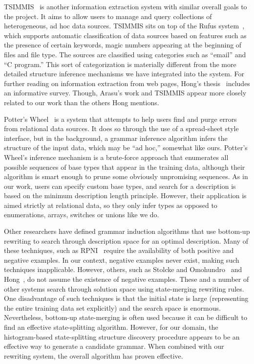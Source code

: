 TSIMMIS~\cite{chawathe+:tsimmis} is another information extraction
system with similar overall goals to the \pads{} project.  It aims to
allow users to manage and query collections of heterogeneous, ad hoc
data sources.  TSIMMIS sits on top of the Rufus
system~\cite{shoens+:rufus}, which supports automatic classification
of data sources based on features such as the presence of certain
keywords, magic numbers appearing at the beginning of files and file
type.  The sources are classified using categories such as ``email''
and ``C program.''  This sort of categorization is materially
different from the more detailed structure inference mechanisms we
have integrated into the \pads{} system.  For further reading on
information extraction from web pages, Hong's
thesis~\cite{hong:thesis} includes an informative survey.  Though,
Arasu's work and TSIMMIS appear more closely related to our work than
the others Hong mentions.

Potter's Wheel~\cite{raman+:potterwheel} is a system that attempts to
help users find and purge errors from
relational data sources.  It does so through the use of a spread-sheet
style interface, but in the background, a grammar inference algorithm
infers the structure of the input data, which may be ``ad hoc,'' 
somewhat like ours.  Potter's Wheel's inference mechanism is a brute-force
approach that enumerates all possible sequences of base types that appear
in the training data, although their algorithm is smart enough to
prune some obviously unpromising sequences.  As in our work,
users can specify custom base types, and search for a description
is based on the minimum description length principle.  However,
their application is aimed
strictly at relational data, so they only infer  types
as opposed to enumerations, arrays, switches or unions like we do.  

Other researchers have defined grammar induction algorithms that use
bottom-up rewriting to search through description space for an optimal
description.  Many of these techniques, such as RPNI~\cite{rpni} 
require the availability of both
positive and negative examples.  In our context, negative examples
never exist, making such techniques inapplicable.
However, others, such as Stolcke and
Omohundro~\cite{stolcke94inducing} and Hong~\cite{hong01using}, do not
assume the existence of negative examples.  These and a number of other systems
search through solution space using
state-merging rewriting rules.  One disadvantage of such
techniques is that the initial state is large (representing
the entire training data set explicitly) and the search space is 
enormous.  Nevertheless, bottom-up state-merging is often used because
it can be difficult to find an effective state-splitting algorithm.
However, for our domain, the histogram-based state-splitting structure
discovery procedure appears to be an effective way to generate a candidate
grammar.  When combined with our rewriting system, the overall
algorithm has proven effective.

